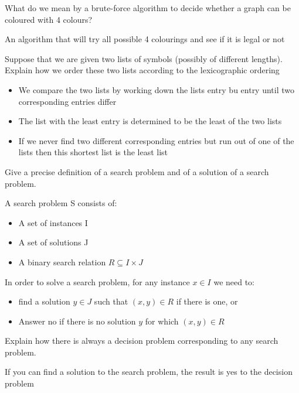 \documentclass{exam}
\begin{document}
\begin{questions}
\question[2]What do we mean by a brute-force algorithm to decide whether a graph
can be coloured with 4 colours?
\begin{solution}[2in]
	An algorithm that will try all possible 4 colourings and see if it is legal or not
\end{solution}

\question[3]Suppose that we are given two lists of symbols (possibly of different
lengths). Explain how we order these two lists according to the lexicographic
ordering
\begin{solution}[2in]
	\begin{itemize}
		\item We compare the two lists by working down the lists entry bu entry until two corresponding entries differ
		\item The list with the least entry is determined to be the least of the two lists
		\item If we never find two different corresponding entries but run out of one of the lists then this shortest list is the least list
	\end{itemize}
\end{solution}

\question[5]Give a precise definition of a search problem and of a solution of a
search problem.
\begin{solution}[2in]
	A search problem S consists of:
	\begin{itemize}
		\item A set of instances I
		\item A set of solutions J
		\item A binary search relation $R\subseteq I\times J$
	\end{itemize}
	In order to solve a search problem, for any instance $x\in I$ we need to:
	\begin{itemize}
		\item find a solution $y\in J$ such that $(x,y)\in R$ if there is one, or
		\item Answer no if there is no solution $y$ for which $(x,y)\in R$
	\end{itemize}
\end{solution}
\newpage
\question[1]Explain how there is always a decision problem corresponding to any
search problem.
\begin{solution}[2in]
	If you can find a solution to the search problem, the result is yes to the decision problem
\end{solution}


\end{questions}
\end{document}
